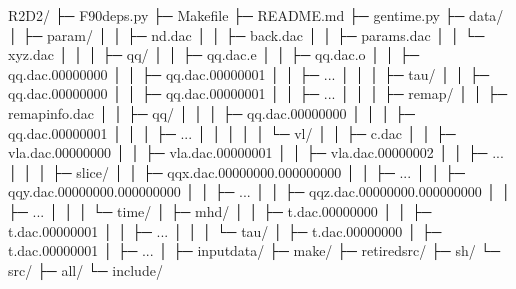 \documentclass[letterpaper,10pt,dvipdfmx,report]{sphinxmanual}
\begin{document}
\begin{sphinxVerbatim}[commandchars=\\\{\}]
R2D2/
   ├─ F90\PYGZus{}deps.py
   ├─ Makefile
   ├─ README.md
   ├─ gen\PYGZus{}time.py
   ├─ data/
   │     ├─ param/
   │     │      ├─ nd.dac
   │     │      ├─ back.dac
   │     │      ├─ params.dac
   │     │      └─ xyz.dac
   │     │
   │     ├─ qq/
   │     │   ├─ qq.dac.e
   │     │   ├─ qq.dac.o
   │     │   ├─ qq.dac.00000000
   │     │   ├─ qq.dac.00000001
   │     │   ├─ ...
   │     │
   │     ├─ tau/
   │     │   ├─ qq.dac.00000000
   │     │   ├─ qq.dac.00000001
   │     │   ├─ ...
   │     │
   │     ├─ remap/
   │     │      ├─ remap\PYGZus{}info.dac
   │     │      ├─ qq/
   │     │      │   ├─ qq.dac.00000000
   │     │      │   ├─ qq.dac.00000001
   │     │      │   ├─ ...
   │     │      │
   │     │      └─ vl/
   │     │          ├─ c.dac
   │     │          ├─ vla.dac.00000000
   │     │          ├─ vla.dac.00000001
   │     │          ├─ vla.dac.00000002
   │     │          ├─ ...
   │     │
   │     ├─ slice/
   │     │   ├─ qqx.dac.00000000.000000000
   │     │   ├─ ...
   │     │   ├─ qqy.dac.00000000.000000000
   │     │   ├─ ...
   │     │   ├─ qqz.dac.00000000.000000000
   │     │   ├─ ...
   │     │
   │     └─ time/
   │           ├─ mhd/
   │           │    ├─ t.dac.00000000
   │           │    ├─ t.dac.00000001
   │           │    ├─ ...
   │           │
   │           └─ tau/
   │                ├─ t.dac.00000000
   │                ├─ t.dac.00000001
   │                ├─ ...
   │
   ├─ input\PYGZus{}data/
   ├─ make/
   ├─ retired\PYGZus{}src/
   ├─ sh/
   └─ src/
        ├─ all/
        └─ include/
\end{sphinxVerbatim}
\end{document}
